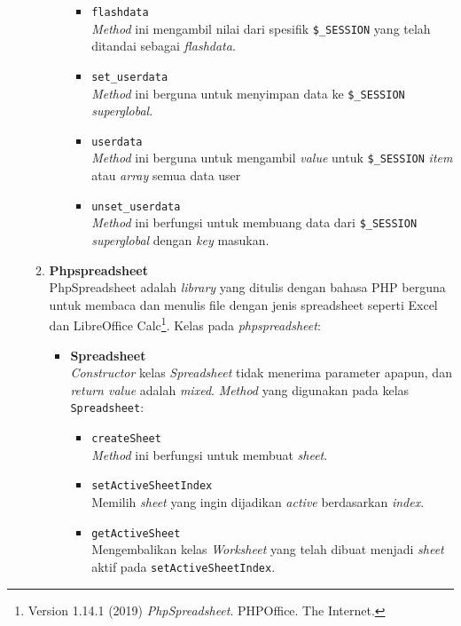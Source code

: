\documentclass[a4paper,twoside]{article}
\begin{document}
\begin{enumerate}
\begin{enumerate}
\begin{itemize}
\begin{itemize}
			\item \texttt{flashdata} \\
			 \textit{Method} ini mengambil nilai dari spesifik \texttt{\$\_SESSION} yang telah ditandai sebagai \textit{flashdata}.
			 
			\item \texttt{set\_userdata} \\
			\textit{Method} ini berguna untuk menyimpan data ke \texttt{\$\_SESSION} \textit{superglobal}.
			
			\item \texttt{userdata} \\
			\textit{Method} ini berguna untuk mengambil \textit{value} untuk \texttt{\$\_SESSION} \textit{item} atau \textit{array} semua data user
			
			\item \texttt{unset\_userdata} \\
			\textit{Method} ini berfungsi untuk membuang data dari \texttt{\$\_SESSION} \textit{superglobal} dengan \textit{key} masukan.
		\end{itemize}	
		\end{itemize}
	
	\item \textbf{Phpspreadsheet} \\
	PhpSpreadsheet adalah \textit{library} yang ditulis dengan bahasa PHP berguna untuk membaca dan menulis file dengan jenis spreadsheet seperti Excel dan LibreOffice Calc\footnote{Version 1.14.1 (2019) \textit{PhpSpreadsheet}. PHPOffice. The Internet.}. Kelas pada \textit{phpspreadsheet}:
	\begin{itemize}		 
		\item \textbf{Spreadsheet} \\ 
		\textit{Constructor} kelas \textit{Spreadsheet} tidak menerima parameter apapun, dan \textit{return value} adalah \textit{mixed}. \textit{Method} yang digunakan pada kelas \texttt{Spreadsheet}:
		\begin{itemize}
			\item \texttt{createSheet} \\
			\textit{Method} ini berfungsi untuk membuat \textit{sheet}.
			\item \texttt{setActiveSheetIndex} \\
			Memilih \textit{sheet} yang ingin dijadikan \textit{active} berdasarkan \textit{index}.
			\item \texttt{getActiveSheet} \\
			Mengembalikan kelas \textit{Worksheet} yang telah dibuat menjadi \textit{sheet} aktif pada \texttt{setActiveSheetIndex}.
		\end{itemize}
	

\end{itemize}
\end{enumerate}
\end{enumerate}
\end{document}
